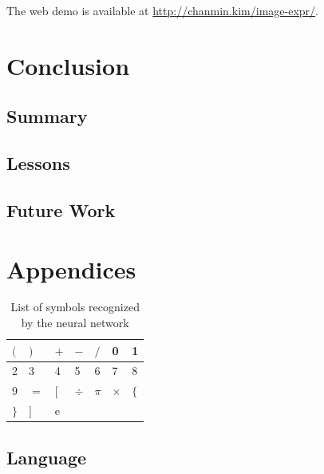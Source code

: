 \documentclass[10pt,twocolumn,letterpaper]{article}
\begin{document}
The web demo is available at \url{http://chanmin.kim/image-expr/}.


\section{Conclusion}

\subsection{Summary}


\subsection{Lessons}


\subsection{Future Work}


{\small


}

\section{Appendices}

\begin{table}[h]
\centering
\begin{tabular}{|l|l|l|l|l|l|l|}
\hline
$($ & $)$ & $+$ & $-$ & $/$ & 0 & 1 \\ \hline
2 & 3 & 4 & 5 & 6 & 7 & 8 \\ \hline
9 & $=$ & $[$ & $\div$ & $\pi$ & $\times$ & $\{$ \\ \hline
$\}$ & $]$ & e & $ $ & $ $ & & \\
\hline
\end{tabular}
\caption{List of symbols recognized by the neural network}
\label{tbl:symbollist}
\end{table}



\subsection{Language}
\end{document}
